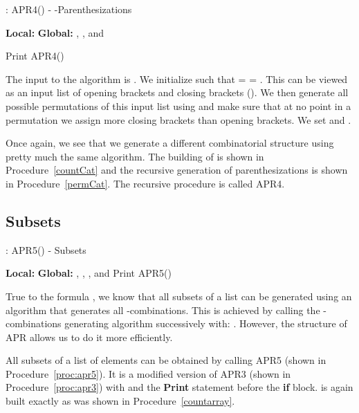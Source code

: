 \documentclass{article}
\begin{document}
\begin{algorithm}
\begin{algorithmic}[1]
\caption{: APR4() - -Parenthesizations}
\label{permCat}
\STATE \textbf{Local:} 
\STATE \textbf{Global:} , ,  and 
\medskip

\IF{}
	\STATE Print 
	\RETURN
\ELSE
\FOR{}
		\STATE  
		\STATE 
		\STATE APR4()
		\STATE 
	\ENDIF
\ENDFOR
\ENDIF
\end{algorithmic}
\end{algorithm}

The input to the algorithm is . We initialize  such that  =  = . This can be viewed as an input list of  opening brackets and  closing brackets (). We then generate all possible permutations of this input list using  and make sure that at no point in a permutation we assign more closing brackets than opening brackets. We set  and .

Once again, we see that we generate a different combinatorial structure using pretty much the same algorithm. The building of  is shown in Procedure~\ref{countCat} and the recursive generation of parenthesizations is shown in Procedure~\ref{permCat}. The recursive procedure is called APR4.

\subsection{Subsets}

\begin{algorithm}
\begin{algorithmic}[1]
\caption{: APR5() - Subsets}
\label{proc:apr5}
\STATE \textbf{Local:} 
\STATE \textbf{Global:} , , ,  and 
\medskip
\STATE Print  \label{proc:apr5:line:print}
\IF{}
	\RETURN
\ELSE
		 \label{proc:apr5:line:cond}
			\STATE  
			\STATE 
			\STATE APR5()
			\STATE 
		\ENDIF
	\ENDFOR
\ENDIF
\end{algorithmic}
\end{algorithm}

True to the formula , we know that all subsets of a list can be generated using an algorithm that generates all -combinations. This is achieved by calling the -combinations generating algorithm successively with: . However, the structure of APR allows us to do it more efficiently.

All subsets of a list of  elements can be obtained by calling APR5 (shown in Procedure~\ref{proc:apr5}). It is a modified version of APR3 (shown in Procedure~\ref{proc:apr3}) with  and the \textbf{Print} statement before the \textbf{if} block.  is again built exactly as was shown in Procedure~\ref{countarray}.
\end{document}
